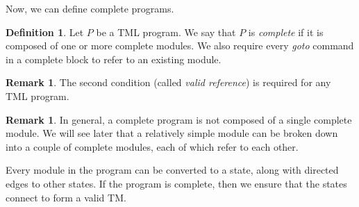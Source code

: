 \documentclass{article}
\theoremstyle{definition}
\newtheorem{definition}[theorem]{Definition}
\newtheorem{remark}[theorem]{Remark}
\begin{document}
    Now, we can define complete programs.
    \begin{definition}
        Let $P$ be a TML program. We say that $P$ is \emph{complete} if it is composed of one or more complete modules. We also require every \textit{goto} command in a complete block to refer to an existing module.
    \end{definition}
    \begin{remark}
        The second condition (called \emph{valid reference}) is required for any TML program.
    \end{remark}
    \begin{remark}
        In general, a complete program is not composed of a single complete module. We will see later that a relatively simple module can be broken down into a couple of complete modules, each of which refer to each other.
    \end{remark}
    Every module in the program can be converted to a state, along with directed edges to other states. If the program is complete, then we ensure that the states connect to form a valid TM.
\end{document}
